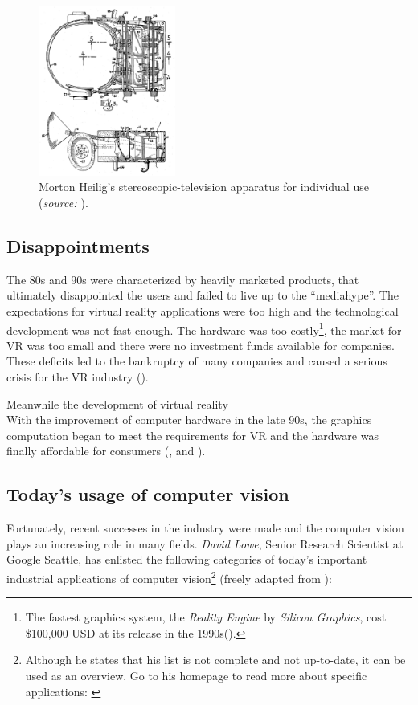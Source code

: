 \begin{figure}[htbp]
		\centering
		\includegraphics[width=0.4\textwidth]{figures/Heilig_HMD}
		\caption[Stereoscopic-television apparatus for individual use]{Morton Heilig's stereoscopic-television apparatus for individual use (\textit{source: \cite{Heilig.1957}}).}
		\label{fig:Heilig}
\end{figure}

\subsection{Disappointments}
The 80s and 90s were characterized by heavily marketed products, that ultimately disappointed the users and failed to live up to the \enquote{mediahype}. The expectations for virtual reality applications were too high and the technological development was not fast enough. The hardware was too costly\footnote{The fastest graphics system, the \textit{Reality Engine} by \textit{Silicon Graphics}, cost \$100,000 USD at its release in the 1990s(\cite[p.10]{Burdea.2003}).}, the market for VR was too small and there were no investment funds available for companies. These deficits led to the bankruptcy of many companies and caused a serious crisis for the VR industry (\cite[p.10]{Burdea.2003}). 

Meanwhile the development of virtual reality  \\

With the improvement of computer hardware in the late 90s, the graphics computation began to meet the requirements for VR and the hardware was finally affordable for consumers (\cite[p.10 et seq.]{Burdea.2003}, \cite{Doerner.2013} and \cite[p.3]{Toennis.2010}).

\subsection{Today's usage of computer vision}\label{ssec:Today}
Fortunately, recent successes in the industry were made and the computer vision plays an increasing role in many fields. \textit{David Lowe}, Senior Research Scientist at Google Seattle, has enlisted the following categories of today's important industrial applications of computer vision\footnote{Although he states that his list is not complete and not up-to-date, it can be used as an overview. Go to his homepage to read more about specific applications: \cite{Lowe.2016}} (freely adapted from \cite{Lowe.2016}): 

